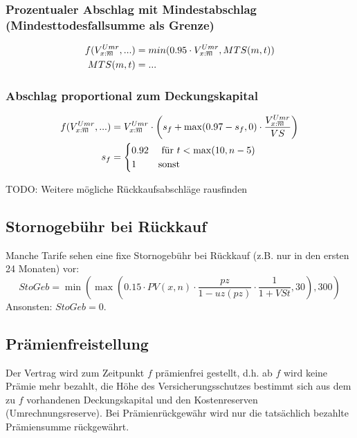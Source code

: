 \documentclass[a4paper,10pt]{article}
\makeatletter
\newcommand{\xn}{{\act[x]{n}}}
\DeclareRobustCommand{\act}[2][]{%
\def\arraystretch{0}%
\setlength\arraycolsep{0.5pt}%
\setlength\arrayrulewidth{0.5pt}%
\setbox0=\hbox{$\scriptstyle#1\ifx#1\empty{asdf}\else:\fi#2$}%
\begin{array}[b]{*2{@{}>{\scriptstyle}c}|}
\cline{2-2}%
\rule[1.25pt]{0pt}{\ht0}%
#1\ifx#1\empty\else:\fi & #2%
\end{array}%
}
\makeatother
\begin{document}
\subsubsection*{Prozentualer Abschlag mit Mindestabschlag (Mindesttodesfallsumme als Grenze)}
\begin{align*}
f(V_\xn^{Umr}, ...) &= min(0.95 \cdot V_\xn^{Umr}, MTS(m,t)) \\
MTS(m,t) &= ...
\end{align*}


\subsubsection*{Abschlag proportional zum Deckungskapital}
\begin{align*}
f(V_\xn^{Umr}, ...) &= V_\xn^{Umr}\cdot \left(s_f + \max(0.97-s_f, 0) \cdot \frac{V_\xn^{Umr}}{VS}\right) \\
s_f &=\begin{cases}0.92 & \text{ für $t<\max(10, n-5)$}\\ 1 & \text{sonst}\end{cases}
\end{align*}


TODO: Weitere mögliche Rückkaufsabschläge rausfinden

\subsection{Stornogebühr bei Rückkauf}

Manche Tarife sehen eine fixe Stornogebühr bei Rückkauf (z.B. nur in den ersten 24 Monaten) vor:
\begin{equation*}
 StoGeb = \min\left(\max\left(0.15 \cdot PV(x,n) \cdot\frac{pz}{1-uz(pz)} \cdot\frac1{1+VSt}, 30 \right), 300\right)
\end{equation*}
Ansonsten: $StoGeb=0$.



\subsection{Prämienfreistellung}

Der Vertrag wird zum Zeitpunkt $f$ prämienfrei gestellt, d.h. ab $f$ wird keine Prämie mehr bezahlt, 
die Höhe des Versicherungsschutzes bestimmt sich aus dem zu $f$ vorhandenen Deckungskapital und den 
Kostenreserven (Umrechnungsreserve). Bei Prämienrückgewähr wird nur die tatsächlich bezahlte Prämiensumme rückgewährt.
\end{document}
